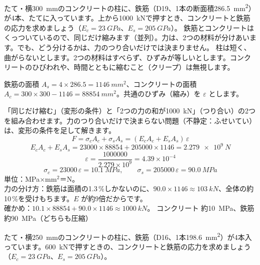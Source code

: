 \begin{phreidai}[鉄筋コンクリートの柱]
\label{ph:力-8:ex11}たて・横\qty{300}{mm}のコンクリートの柱に、鉄筋（D19、1本の断面積\qty{286.5}{mm^2}）が4本、たてに入っています。上から\qty{1000}{kN}で押すとき、コンクリートと鉄筋の応力を求めましょう（$E_c=\qty{23}{GPa}$、$E_s=\qty{205}{GPa}$）。
\phbamen
鉄筋とコンクリートはくっついているので、同じだけ縮みます（並列）。力は、2つの材料が分けあいます。でも、どう分けるかは、力のつり合いだけでは決まりません。
\phmushi
柱は短く、曲がらないとします。2つの材料はすべらず、ひずみが等しいとします。コンクリートのひびわれや、時間とともに縮むこと（クリープ）は無視します。
\phzu
\noindent\begin{minipage}[c]{0.34\linewidth}\centering
{}
\end{minipage}\hfill
\begin{minipage}[c]{0.62\linewidth}\raggedright
鉄筋の面積 $A_s=4\times286.5=\qty{1146}{mm^2}$、コンクリートの面積 $A_c=300\times300-1146=\qty{88854}{mm^2}$。共通のひずみ（縮み）を $\varepsilon$ とします。
\end{minipage}
\phriyu
「同じだけ縮む」（変形の条件）と「2つの力の和が\qty{1000}{kN}」（つり合い）の2つを組み合わせます。力のつり合いだけで決まらない問題（不静定：ふせいてい）は、変形の条件を足して解きます。
\phtateru
\[F=\sigma_cA_c+\sigma_sA_s=(E_cA_c+E_sA_s)\,\varepsilon\]
\phtoku
\[E_cA_c+E_sA_s=\num{23000}\times\num{88854}+\num{205000}\times1146=\qty{2.279e9}{N}\]
\[\varepsilon=\frac{\num{1000000}}{2.279\times10^9}=4.39\times10^{-4}\]
\[\sigma_c=\num{23000}\,\varepsilon=\qty{10.1}{MPa},\qquad\sigma_s=\num{205000}\,\varepsilon=\qty{90.0}{MPa}\]
\phtashikame
単位：MPa×mm$^2$＝N。\\
力の分け方：鉄筋は面積の1.3\,\%しかないのに、$90.0\times1146\approx\qty{103}{kN}$、全体の約10\,\%を受けもちます。$E$ が約9倍だからです。\\
確かめ：$10.1\times\num{88854}+90.0\times1146\approx\qty{1000}{kN}$。
\kotae コンクリート 約\qty{10}{MPa}、鉄筋 約\qty{90}{MPa}（どちらも圧縮）
\end{phreidai}
\begin{jibun}
たて・横\qty{250}{mm}のコンクリートの柱に、鉄筋（D16、1本\qty{198.6}{mm^2}）が4本入っています。\qty{600}{kN}で押すときの、コンクリートと鉄筋の応力を求めましょう（$E_c=\qty{23}{GPa}$、$E_s=\qty{205}{GPa}$）。
\end{jibun}

